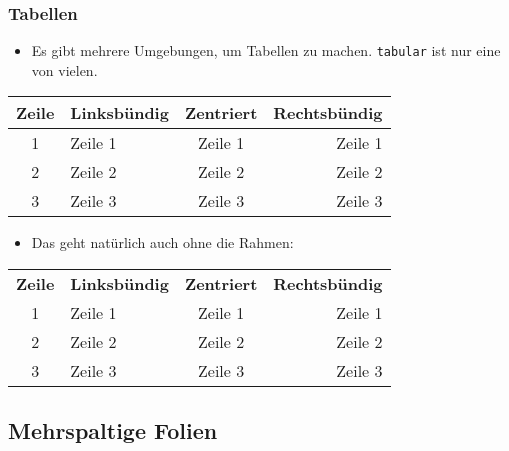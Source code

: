 \begin{frame}[fragile]
	\frametitle{Tabellen}
	\begin{itemize}
		\item Es gibt mehrere Umgebungen, um Tabellen zu machen. \texttt{tabular} ist nur eine von vielen.
	\end{itemize}
	
	\begin{center}
		\begin{tabular}{|c|l|c|r|}
			\hline
			\textbf{Zeile} & \textbf{Linksbündig} & \textbf{Zentriert} & \textbf{Rechtsbündig} \\
			\hline\hline
			1 & Zeile 1 & Zeile 1 & Zeile 1 \\
			2 & Zeile 2 & Zeile 2 & Zeile 2 \\
			3 & Zeile 3 & Zeile 3 & Zeile 3 \\
			\hline
		\end{tabular}
	\end{center}
	
	\begin{itemize}
		\item Das geht natürlich auch ohne die Rahmen:
	\end{itemize}
	
	\begin{center}
		\begin{tabular}{clcr}
			\textbf{Zeile} & \textbf{Linksbündig} & \textbf{Zentriert} & \textbf{Rechtsbündig} \\
			1 & Zeile 1 & Zeile 1 & Zeile 1 \\
			2 & Zeile 2 & Zeile 2 & Zeile 2 \\
			3 & Zeile 3 & Zeile 3 & Zeile 3 \\
		\end{tabular}
	\end{center}
\end{frame}


\subsection{Mehrspaltige Folien}


